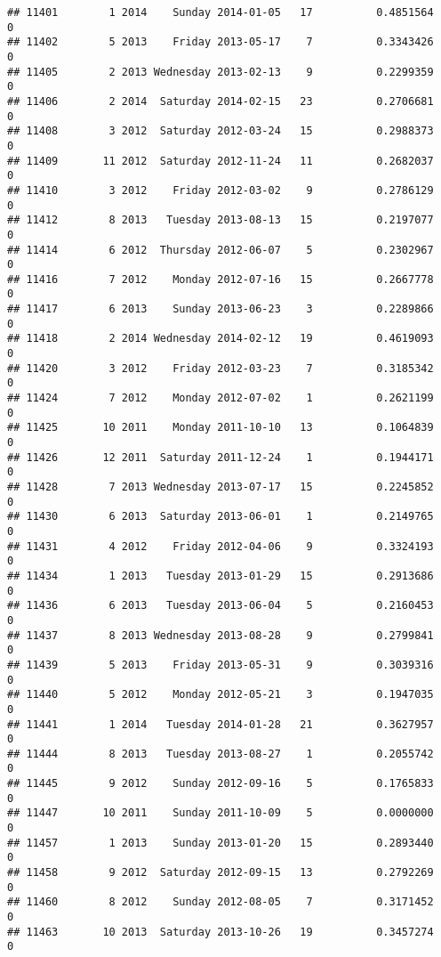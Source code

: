 \documentclass[
]{article}
\begin{document}
\begin{verbatim}
## 11401        1 2014    Sunday 2014-01-05   17          0.4851564             0
## 11402        5 2013    Friday 2013-05-17    7          0.3343426             0
## 11405        2 2013 Wednesday 2013-02-13    9          0.2299359             0
## 11406        2 2014  Saturday 2014-02-15   23          0.2706681             0
## 11408        3 2012  Saturday 2012-03-24   15          0.2988373             0
## 11409       11 2012  Saturday 2012-11-24   11          0.2682037             0
## 11410        3 2012    Friday 2012-03-02    9          0.2786129             0
## 11412        8 2013   Tuesday 2013-08-13   15          0.2197077             0
## 11414        6 2012  Thursday 2012-06-07    5          0.2302967             0
## 11416        7 2012    Monday 2012-07-16   15          0.2667778             0
## 11417        6 2013    Sunday 2013-06-23    3          0.2289866             0
## 11418        2 2014 Wednesday 2014-02-12   19          0.4619093             0
## 11420        3 2012    Friday 2012-03-23    7          0.3185342             0
## 11424        7 2012    Monday 2012-07-02    1          0.2621199             0
## 11425       10 2011    Monday 2011-10-10   13          0.1064839             0
## 11426       12 2011  Saturday 2011-12-24    1          0.1944171             0
## 11428        7 2013 Wednesday 2013-07-17   15          0.2245852             0
## 11430        6 2013  Saturday 2013-06-01    1          0.2149765             0
## 11431        4 2012    Friday 2012-04-06    9          0.3324193             0
## 11434        1 2013   Tuesday 2013-01-29   15          0.2913686             0
## 11436        6 2013   Tuesday 2013-06-04    5          0.2160453             0
## 11437        8 2013 Wednesday 2013-08-28    9          0.2799841             0
## 11439        5 2013    Friday 2013-05-31    9          0.3039316             0
## 11440        5 2012    Monday 2012-05-21    3          0.1947035             0
## 11441        1 2014   Tuesday 2014-01-28   21          0.3627957             0
## 11444        8 2013   Tuesday 2013-08-27    1          0.2055742             0
## 11445        9 2012    Sunday 2012-09-16    5          0.1765833             0
## 11447       10 2011    Sunday 2011-10-09    5          0.0000000             0
## 11457        1 2013    Sunday 2013-01-20   15          0.2893440             0
## 11458        9 2012  Saturday 2012-09-15   13          0.2792269             0
## 11460        8 2012    Sunday 2012-08-05    7          0.3171452             0
## 11463       10 2013  Saturday 2013-10-26   19          0.3457274             0

\end{verbatim}
\end{document}
